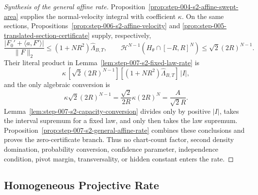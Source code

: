 \begin{proof}[Synthesis of the general affine rate]
Proposition~\ref{prop:step-004-s2-affine-swept-area} supplies the
normal-velocity integral with coefficient $\kappa$.  On the same sections,
Propositions~\ref{prop:step-006-s2-affine-velocity} and
\ref{prop:step-005-translated-section-certificate} supply, respectively,
\begin{equation}
\label{eq:appendix-display-212}
\frac{|F_0'+\langle a,F'\rangle|}{\|F\|_2}
\leq(1+NR^2)\widehat\Lambda_{B,T},
\qquad
\mathcal H^{N-1}(H_\theta\cap[-R,R]^N)
\leq\sqrt2(2R)^{N-1}.
\end{equation}
Their literal product in Lemma~\ref{lem:step-007-s2-fixed-law-rate} is
\begin{equation}
\label{eq:appendix-display-213}
\kappa\,[\sqrt2(2R)^{N-1}]
[(1+NR^2)\widehat\Lambda_{B,T}]\,|I|,
\end{equation}
and the only algebraic conversion is
\begin{equation}
\label{eq:appendix-display-214}
\kappa\sqrt2(2R)^{N-1}
=\frac{\sqrt2}{2R}\kappa(2R)^N
=\frac{A}{\sqrt2R}.
\end{equation}
Lemma~\ref{lem:step-007-s2-capacity-conversion} divides only by positive
$|I|$, takes the interval supremum for a fixed law, and only then takes the
law supremum.  Proposition~\ref{prop:step-007-s2-general-affine-rate}
combines these conclusions and proves the zero-certificate branch.  Thus no
chart-count factor, second density domination, probability conversion,
confidence parameter, independence condition, pivot margin, transversality,
or hidden constant enters the rate.
\end{proof}

\subsection{Homogeneous Projective Rate}\label{app:step-008}

